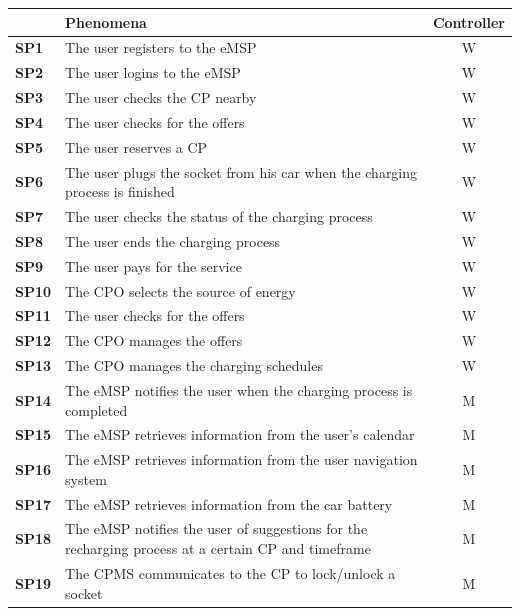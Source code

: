 \documentclass{Configuration_Files/PoliMi3i_thesis}
\begin{document}
\begin{table}[H]
\centering 
    \begin{tabularx}{\textwidth}{|p{3em}|X|c|}
    \hline
    \rowcolor{bluepoli!40}
     & \textbf{Phenomena} & \textbf{Controller}\T\B \\
    \hline \hline
    \textbf{SP1} & The user registers to the eMSP & W\T\B\\
    \hline
    \textbf{SP2} & The user logins to the eMSP & W\T\B\\
    \hline
    \textbf{SP3} & The user checks the CP nearby & W\T\B\\
    \hline
    \textbf{SP4} & The user checks for the offers & W\B\\
    \hline
    \textbf{SP5} & The user reserves a CP & W\B\\
    \hline
    \textbf{SP6} & The user plugs the socket from his car when the charging process is finished & W\B\\
    \hline
    \textbf{SP7} & The user checks the status of the charging process & W\B\\
    \hline
    \textbf{SP8} & The user ends the charging process & W\B\\
    \hline
    \textbf{SP9} & The user pays for the service & W\B\\
    \hline
    \textbf{SP10} & The CPO selects the source of energy & W\B\\
    \hline
    \textbf{SP11} & The user checks for the offers & W\B\\
    \hline
    \textbf{SP12} & The CPO manages the offers & W\B\\
    \hline
    \textbf{SP13} & The CPO manages the charging schedules & W\B\\
    \hline
    \textbf{SP14} & The eMSP notifies the user when the charging process is completed & M\B\\
    \hline
    \textbf{SP15} & The eMSP retrieves information from the user's calendar & M\B\\
    \hline
    \textbf{SP16} & The eMSP retrieves information from the user navigation system & M\B\\
    \hline
    \textbf{SP17} & The eMSP retrieves information from the car battery & M\B\\
    \hline
    \textbf{SP18} & The eMSP notifies the user of suggestions for the recharging process at a certain CP and timeframe & M\B\\
    \hline
    \textbf{SP19} & The CPMS communicates to the CP to lock/unlock a socket & M\B\\

\end{tabularx}
\end{table}
\end{document}
